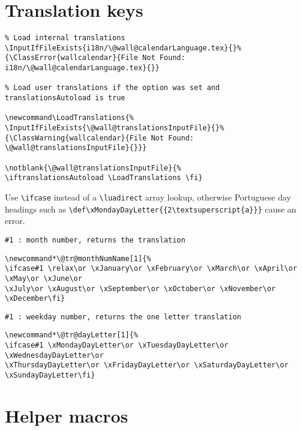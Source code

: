\documentclass[11pt,oneside]{memoir-article}
\begin{document}
\chapter{Translation keys}
\label{sec:org9ce89e8}

\begin{verbatim}
% Load internal translations
\InputIfFileExists{i18n/\@wall@calendarLanguage.tex}{}%
{\ClassError{wallcalendar}{File Not Found: i18n/\@wall@calendarLanguage.tex}{}}

% Load user translations if the option was set and translationsAutoload is true

\newcommand\LoadTranslations{%
\InputIfFileExists{\@wall@translationsInputFile}{}%
{\ClassWarning{wallcalendar}{File Not Found: \@wall@translationsInputFile}{}}}

\notblank{\@wall@translationsInputFile}{%
\iftranslationsAutoload \LoadTranslations \fi}
\end{verbatim}

Use \texttt{\textbackslash{}ifcase} instead of a \texttt{\textbackslash{}luadirect} array lookup, otherwise Portuguese day
headings such as \texttt{\textbackslash{}def\textbackslash{}xMondayDayLetter\{\{2\textbackslash{}textsuperscript\{a\}\}\}} cause an error.

\begin{verbatim}
#1 : month number, returns the translation
\end{verbatim}

\begin{verbatim}
\newcommand*\@tr@monthNumName[1]{%
\ifcase#1 \relax\or \xJanuary\or \xFebruary\or \xMarch\or \xApril\or \xMay\or \xJune\or
\xJuly\or \xAugust\or \xSeptember\or \xOctober\or \xNovember\or \xDecember\fi}
\end{verbatim}

\begin{verbatim}
#1 : weekday number, returns the one letter translation 
\end{verbatim}

\begin{verbatim}
\newcommand*\@tr@dayLetter[1]{%
\ifcase#1 \xMondayDayLetter\or \xTuesdayDayLetter\or \xWednesdayDayLetter\or
\xThursdayDayLetter\or \xFridayDayLetter\or \xSaturdayDayLetter\or \xSundayDayLetter\fi}
\end{verbatim}

\chapter{Helper macros}
\label{sec:org3563e80}
\end{document}
